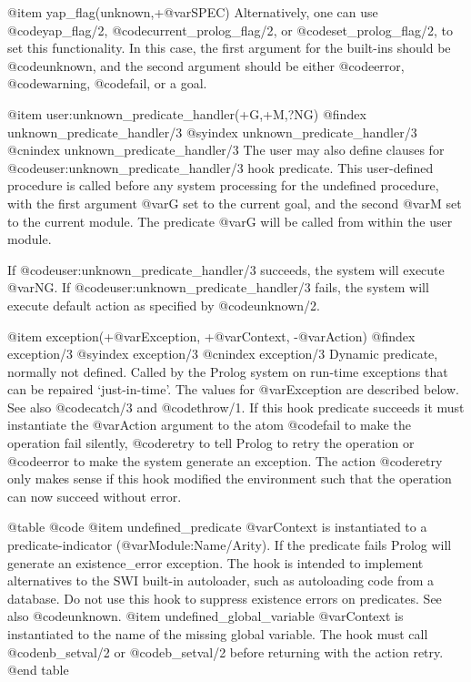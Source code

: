 {{{{@item yap_flag(unknown,+@var{SPEC})
Alternatively, one can use @code{yap_flag/2},
@code{current_prolog_flag/2}, or @code{set_prolog_flag/2}, to set this
functionality. In this case, the first argument for the built-ins should
be @code{unknown}, and the second argument should be either
@code{error}, @code{warning}, @code{fail}, or a goal.

@item user:unknown_predicate_handler(+G,+M,?NG)
@findex unknown_predicate_handler/3
@syindex unknown_predicate_handler/3
@cnindex unknown_predicate_handler/3
The user may also define clauses for
@code{user:unknown_predicate_handler/3} hook predicate. This
user-defined procedure is called before any system processing for the
undefined procedure, with the first argument @var{G} set to the current
goal, and the second @var{M} set to the current module. The predicate
@var{G} will be called from within the user module.

If @code{user:unknown_predicate_handler/3} succeeds, the system will
execute @var{NG}. If  @code{user:unknown_predicate_handler/3} fails, the
system will execute default action as specified by @code{unknown/2}.

@item exception(+@var{Exception}, +@var{Context}, -@var{Action})
@findex exception/3
@syindex exception/3
@cnindex exception/3
 Dynamic predicate, normally not defined. Called by the Prolog system on run-time exceptions that can be repaired `just-in-time'. The values for @var{Exception} are described below. See also @code{catch/3} and @code{throw/1}.
If this hook predicate succeeds it must instantiate the @var{Action} argument to the atom @code{fail} to make the operation fail silently, @code{retry} to tell Prolog to retry the operation or @code{error} to make the system generate an exception. The action @code{retry} only makes sense if this hook modified the environment such that the operation can now succeed without error.

@table @code
@item undefined_predicate
@var{Context} is instantiated to a predicate-indicator (@var{Module:Name/Arity}). If the predicate fails Prolog will generate an existence_error exception. The hook is intended to implement alternatives to the SWI built-in autoloader, such as autoloading code from a database. Do not use this hook to suppress existence errors on predicates. See also @code{unknown}.
@item undefined_global_variable
@var{Context} is instantiated to the name of the missing global variable. The hook must call @code{nb_setval/2} or @code{b_setval/2} before returning with the action retry.
@end table

}}}}
